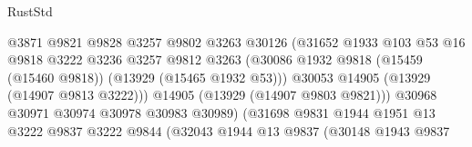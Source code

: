 \begin{lexlean}{RustStd}
\begin{coremodule}
                                            @3871
                                            @9821
                                            @9828
                                            @3257
                                            @9802
                                            @3263
                                            @30126
                                            (@31652
                                              @1933
                                              @103
                                              @53
                                              @16
                                              @9818
                                              @3222
                                              @3236
                                              @3257
                                              @9812
                                              @3263
                                              (@30086
                                                @1932
                                                @9818
                                                (@15459 (@15460 @9818))
                                                (@13929 (@15465 @1932 @53)))
                                              @30053
                                              @14905
                                              (@13929 (@14907 @9813 @3222)))
                                            @14905
                                            (@13929 (@14907 @9803 @9821)))
                                          @30968
                                          @30971
                                          @30974
                                          @30978
                                          @30983
                                          @30989)
                                        (@31698
                                          @9831
                                          @1944
                                          @1951
                                          @13
                                          @3222
                                          @9837
                                          @3222
                                          @9844
                                          (@32043
                                            @1944
                                            @13
                                            @9837
                                            (@30148
                                              @1943
                                              @9837

\end{coremodule}
\end{lexlean}
